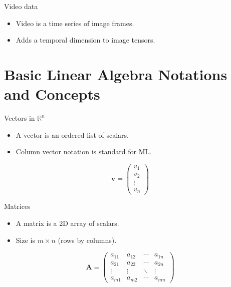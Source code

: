\documentclass[12pt]{beamer}
\begin{document}
\begin{frame}{Video data}
  \begin{itemize}
    \item Video is a time series of image frames.
    \item Adds a temporal dimension to image tensors.
  \end{itemize}
  \vspace{0.5em}
  \centering
\end{frame}

\section{Basic Linear Algebra Notations and Concepts}

\begin{frame}{Vectors in $\mathbb{R}^n$}
  \begin{itemize}
    \item A vector is an ordered list of scalars.
    \item Column vector notation is standard for ML.
  \end{itemize}
  \[
  \bm{v} =
  \begin{pmatrix}
  v_1 \\
  v_2 \\
  \vdots \\
  v_n
  \end{pmatrix}
  \]
\end{frame}

\begin{frame}{Matrices}
  \begin{itemize}
    \item A matrix is a 2D array of scalars.
    \item Size is $m \times n$ (rows by columns).
  \end{itemize}
  \[
  \bm{A} =
  \begin{pmatrix}
  a_{11} & a_{12} & \cdots & a_{1n} \\
  a_{21} & a_{22} & \cdots & a_{2n} \\
  \vdots & \vdots & \ddots & \vdots \\
  a_{m1} & a_{m2} & \cdots & a_{mn}
  \end{pmatrix}
  \]
\end{frame}
\end{document}

